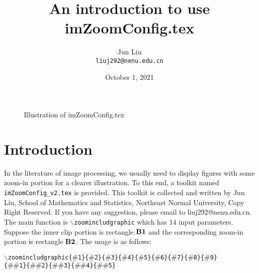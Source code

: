 \documentclass[11pt]{article}
\begin{document}
\date{October 1, 2021}
\title{An introduction to use imZoomConfig.tex}
\author{Jun Liu\\\texttt{liuj292@nenu.edu.cn}}
   

\maketitle

\begin{figure}[!ht]
\centering
	\caption{Illustration of imZoomConfig.tex}
	\label{illus}
\end{figure}

\section{Introduction}

In the literature of image processing, we usually need to display figures with some zoom-in portion for a clearer illustration. To this end, a toolkit named \texttt{imZoomConfig\_v2.tex} is provided. This toolkit is collected and written by Jun Liu, School of Mathematics and Statistics, Northeast Normal University, Copy Right Reserved. If you have any suggestion, please email to liuj292@nenu.edu.cn. The main function is \texttt{$\backslash$zoomincludgraphic} which has 14 input parameters. Suppose the inner clip portion is rectangle $\rm\bf{B}1$ and the corresponding zoom-in portion is rectangle $\rm\bf{B}2$.  The usage is as follows:

\texttt{$\backslash$zoomincludgraphic\{$\#$1\}\{$\#$2\}\{$\#$3\}\{$\#$4\}\{$\#$5\}\{$\#$6\}\{$\#$7\}\{$\#$8\}\{$\#$9\}}\\ \texttt{\{$\#\#$1\}\{$\#\#$2\}\{$\#\#$3\}\{$\#\#$4\}\{$\#\#$5\}} 
\end{document}
